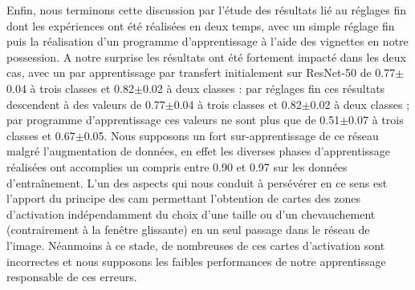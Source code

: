 Enfin, nous terminons cette discussion par l'étude des résultats lié au réglages fin dont les expériences ont été réalisées en deux temps, avec un simple réglage fin puis la réalisation d'un programme d'apprentissage à l'aide des vignettes en notre possession. A notre surprise les résultats ont été fortement impacté dans les deux cas, avec un \fscore{} par apprentissage par transfert initialement sur ResNet-50 de 0.77$\pm$0.04 à trois classes et 0.82$\pm$0.02 à deux classes : par réglages fin ces résultats descendent à des valeurs de 0.77$\pm$0.04 à trois classes et 0.82$\pm$0.02 à deux classes ; par programme d'apprentissage ces valeurs ne sont plus que de 0.51$\pm$0.07 à trois classes et 0.67$\pm$0.05. Nous supposons un fort sur-apprentissage de ce réseau malgré l'augmentation de données, en effet les diverses phases d'apprentissage réalisées ont accomplies un \fscore{} compris entre 0.90 et 0.97 sur les données d'entraînement. L'un des aspects qui nous conduit à persévérer en ce sens est l'apport du principe des \gls{cam} permettant l'obtention de cartes des zones d'activation indépendamment du choix d'une taille ou d'un chevauchement (contrairement à la fenêtre glissante) en un seul passage dans le réseau de l'image. Néanmoins à ce stade, de nombreuses de ces cartes d'activation sont incorrectes et nous supposons les faibles performances de notre apprentissage responsable de ces erreurs.\par
